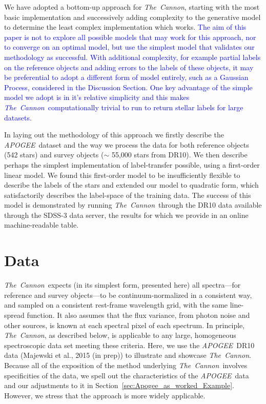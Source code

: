 \documentclass[12pt, preprint]{aastex}
\newcommand{\sectionname}{Section}
\newcommand{\tc}{\textsl{The~Cannon}}
\newcommand{\apogee}{\textsl{APOGEE}}
\begin{document}
We have adopted a bottom-up approach for \tc, starting with the most basic implementation and successively adding complexity to the generative model to determine the least complex implementation which works.  \textcolor{blue}{The aim of this paper is not to explore all possible models that may work for this approach, nor to converge on an optimal model, but use the simplest model that validates our methodology as successful. With additional complexity, for example partial labels on the reference objects and adding errors to the labels of these objects, it may be preferential to adopt a different form of model entirely, such as a Gaussian Process, considered in the Discussion Section. One key advantage of the simple model we adopt is in it's relative simplicity and this makes \tc\ computationally trivial to run to return stellar labels for large datasets.} 

In laying out the methodology of this approach we firstly describe the \apogee\ dataset and the way we process the data for both reference objects (542 stars) and survey objects ($\sim$ 55,000 stars from DR10). 
We then describe perhaps the simplest implementation of label-transfer possible, using a first-order linear model. We found this first-order model to be insufficiently flexible to describe the labels of the stars and extended our model to quadratic form, which satisfactorily describes the label-space of the training data.
The success of this model is demonstrated by running \tc\ through the DR10 data available through the SDSS-3 data server, the results for which we provide in an online machine-readable table. %

\section{Data}\label{sec:Data}
\tc\ expects (in its simplest form, presented here)
all spectra---for reference and survey objects---to be continuum-normalized in a consistent way,
and sampled on a consistent rest-frame wavelength grid, with the same line-spread function.
It also assumes that the flux variance, from photon noise and other sources, is known at each spectral pixel of each spectrum.
In principle, \tc, as described below, is applicable to any large, homogeneous spectroscopic data set
meeting these criteria.
Here, we use the \apogee\ DR10 data (Majewski et al., 2015 (in prep)) to illustrate and showcase \tc.
Because all of the exposition of the method underlying \tc\ involves specificities of the data,
we spell out the characteristics of the \apogee\ data and our adjustments to it in \sectionname~\ref{sec:Apogee_as_worked_Example}. However, we stress that the approach is more widely applicable. 
\end{document}
